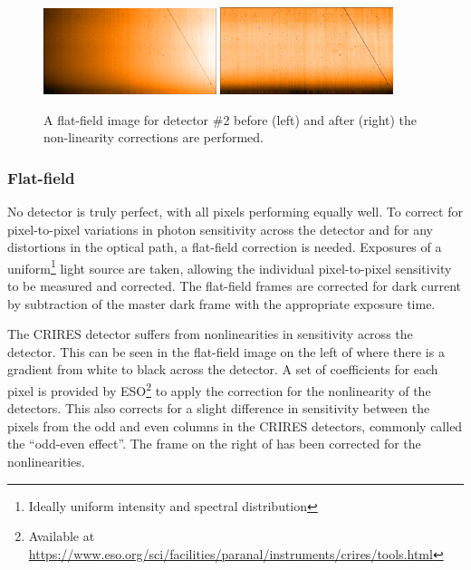 \begin{figure}[h]
    \centering
        \includegraphics[width=0.45\textwidth]{figures/reduction/Flat_2.png} %
        \includegraphics[width=0.45\textwidth]{figures/reduction/FlatR_2.png} %
    \caption{A flat-field image for detector \#2 before (left) and after (right) the non-linearity corrections are performed.}
    \label{fig:masterflats_colour}
\end{figure}


\subsubsection{Flat-field}
\label{subsec:flat-field}
No detector is truly perfect, with all pixels performing equally well. To correct for pixel-to-pixel variations in photon sensitivity across the detector and for any distortions in the optical path, a flat-field correction is needed. Exposures of a uniform\footnote{Ideally uniform intensity and spectral distribution} light source are taken, allowing the individual pixel-to-pixel sensitivity to be measured and corrected. The flat-field frames are corrected for dark current by subtraction of the master dark frame with the appropriate exposure time.

The {CRIRES} detector suffers from nonlinearities in sensitivity across the detector. This can be seen in the flat-field image on the left of  where there is a gradient from white to black across the detector. A set of coefficients for each pixel is provided by {ESO}\footnote{Available at \href{https://www.eso.org/sci/facilities/paranal/instruments/crires/tools.html}{https://www.eso.org/sci/facilities/paranal/instruments/crires/tools.html}} to apply the correction for the nonlinearity of the detectors. This also corrects for a slight difference in sensitivity between the pixels from the odd and even columns in the {CRIRES} detectors, commonly called the ``odd-even effect''. The frame on the right of  has been corrected for the nonlinearities.

